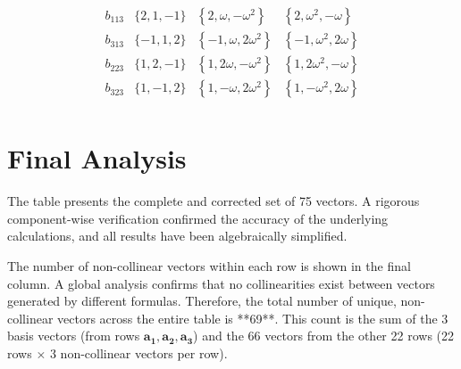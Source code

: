 \documentclass[pra,twocolumn,nofootinbib]{revtex4-2}
\begin{document}
$$\begin{array}{ccccc}
 {b_{113}} & \{2,1,-1\} & \left\{2,\omega   ,-\omega ^2\right\} & \left\{2,\omega ^2,-\omega  \right\} \\
 {b_{313}} & \{-1,1,2\} & \left\{-1,\omega ,2   \omega ^2\right\} & \left\{-1,\omega ^2,2 \omega    \right\} \\
 {b_{223}} & \{1,2,-1\} & \left\{1,2 \omega   ,-\omega ^2\right\} & \left\{1,2 \omega ^2,-\omega    \right\} \\
 {b_{323}} & \{1,-1,2\} & \left\{1,-\omega ,2    \omega ^2\right\} & \left\{1,-\omega ^2,2 \omega  \right\} \\
\end{array}
$$

\twocolumngrid %

\section*{Final Analysis}
The table presents the complete and corrected set of 75 vectors. A rigorous component-wise verification confirmed the accuracy of the underlying calculations, and all results have been algebraically simplified.

The number of non-collinear vectors within each row is shown in the final column. A global analysis confirms that no collinearities exist between vectors generated by different formulas. Therefore, the total number of unique, non-collinear vectors across the entire table is **69**. This count is the sum of the 3 basis vectors (from rows $\mathbf{a_1}, \mathbf{a_2}, \mathbf{a_3}$) and the 66 vectors from the other 22 rows (22 rows $\times$ 3 non-collinear vectors per row).
\end{document}
